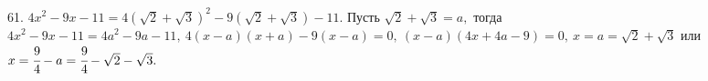 61. $4x^2-9x-11=4(\sqrt{2}+\sqrt{3})^2-9(\sqrt{2}+\sqrt{3})-11.$ Пусть $\sqrt{2}+\sqrt{3}=a,$ тогда $4x^2-9x-11=4a^2-9a-11,\ 4(x-a)(x+a)-9(x-a)=0,\
(x-a)(4x+4a-9)=0,\ x=a=\sqrt{2}+\sqrt{3}$ или $x=\cfrac{9}{4}-a=\cfrac{9}{4}-\sqrt{2}-\sqrt{3}.$\\

